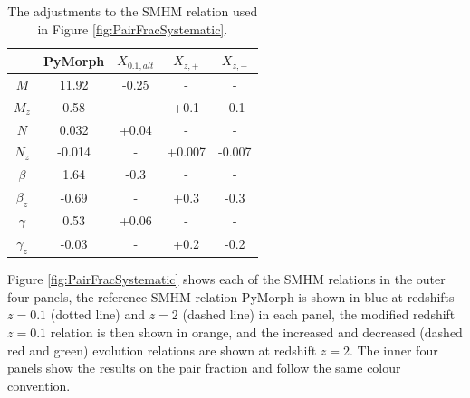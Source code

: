 \begin{table}
\centering
\caption{The adjustments to the SMHM relation used in Figure \ref{fig:PairFracSystematic}.}
\label{tab:PairFracSysInput}
\begin{tabular}{|c|cccc|} \hline
             & PyMorph   & $X_{0.1, alt}$  & $X_{z, +}$  & $X_{z, -}$  \\ \hline
$M$          & 11.92 & -0.25 & -     & -     \\ 
$M_{z}$      & 0.58   & -     & +0.1  & -0.1  \\ \hline
$N$          & 0.032 & +0.04 & -     & -     \\
$N_{z}$      & -0.014 & -     & +0.007 & -0.007 \\ \hline
$\beta$      & 1.64  & -0.3  & -     & -     \\
$\beta_{z}$  & -0.69  & -     & +0.3  & -0.3  \\ \hline
$\gamma$     & 0.53  & +0.06 & -     & -     \\
$\gamma_{z}$ & -0.03  & -     & +0.2  & -0.2  \\ \hline
\end{tabular}
\end{table}

Figure \ref{fig:PairFracSystematic} shows each of the SMHM relations in the outer four panels, the reference SMHM relation PyMorph is shown in blue at redshifts $z = 0.1$ (dotted line) and $z = 2$ (dashed line) in each panel, the modified redshift $z = 0.1$ relation is then shown in orange, and the increased and decreased (dashed red and green) evolution relations are shown at redshift $z = 2$. The inner four panels show the results on the pair fraction and follow the same colour convention. 

